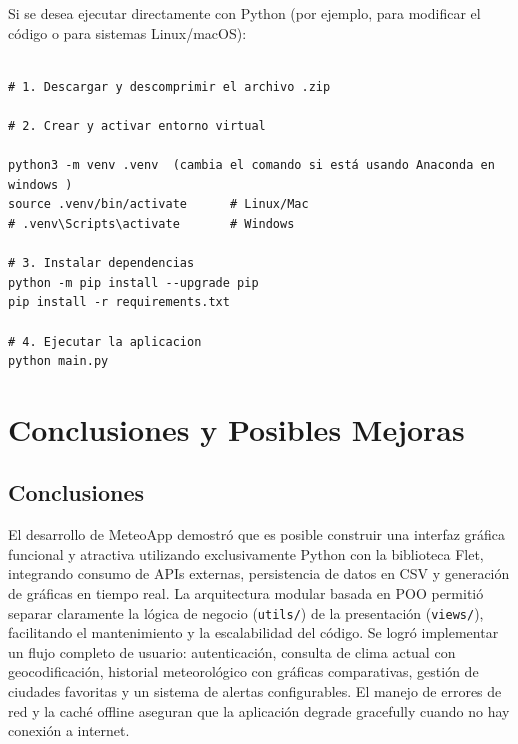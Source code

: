 \documentclass[12pt,a4paper]{article}
\begin{document}
Si se desea ejecutar directamente con Python (por ejemplo, para modificar el código o para sistemas Linux/macOS):
\begin{lstlisting}[frame=none, numbers=none, basicstyle=\ttfamily\small]

# 1. Descargar y descomprimir el archivo .zip

# 2. Crear y activar entorno virtual

python3 -m venv .venv  (cambia el comando si está usando Anaconda en windows )
source .venv/bin/activate      # Linux/Mac
# .venv\Scripts\activate       # Windows

# 3. Instalar dependencias
python -m pip install --upgrade pip
pip install -r requirements.txt

# 4. Ejecutar la aplicacion
python main.py
\end{lstlisting}
\section{Conclusiones y Posibles Mejoras}
\subsection{Conclusiones}
El desarrollo de MeteoApp demostró que es posible construir una interfaz gráfica funcional y atractiva utilizando exclusivamente Python con la biblioteca Flet, integrando consumo de APIs externas, persistencia de datos en CSV y generación de gráficas en tiempo real. La arquitectura modular basada en POO permitió separar claramente la lógica de negocio (\texttt{utils/}) de la presentación (\texttt{views/}), facilitando el mantenimiento y la escalabilidad del código.
Se logró implementar un flujo completo de usuario: autenticación, consulta de clima actual con geocodificación, historial meteorológico con gráficas comparativas, gestión de ciudades favoritas y un sistema de alertas configurables. El manejo de errores de red y la caché offline aseguran que la aplicación degrade gracefully cuando no hay conexión a internet.
\end{document}

